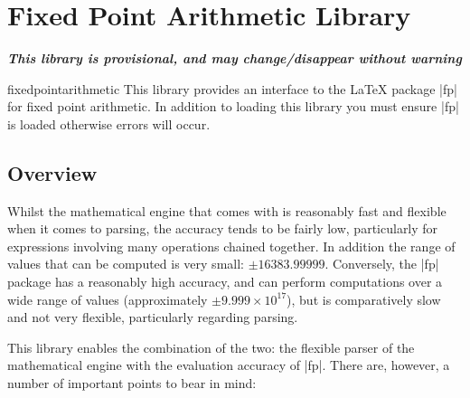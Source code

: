 %
%
%


\section{Fixed Point Arithmetic Library}

{\bf\emph{This library is provisional, and may change/disappear without warning}}

\begin{pgflibrary}{fixedpointarithmetic}
  This library provides an interface to the \LaTeX{} package 
  |fp| for fixed point arithmetic. 	In addition to loading this 
  library you must ensure |fp| is loaded otherwise errors
  will occur. 
\end{pgflibrary}

\subsection{Overview}

  Whilst the mathematical engine that comes with \pgfname{} is 
  reasonably fast and flexible when it comes to parsing, the accuracy
  tends to be fairly low, particularly for expressions involving many 
  operations chained together. In addition the range of values that
  can be computed is very small: $\pm16383.99999$.
	Conversely, the |fp| package has a reasonably high accuracy, and 
	can	perform computations over a wide range of 
	values (approximately $\pm9.999\times10^{17}$), but is comparatively 
	slow and not very 
	flexible, particularly regarding parsing.
  
  This library enables the combination of the two: the flexible parser 
  of the \pgfname{} mathematical engine with the evaluation accuracy 
  of |fp|. There are, however, a number of important points to
  bear in mind: 

